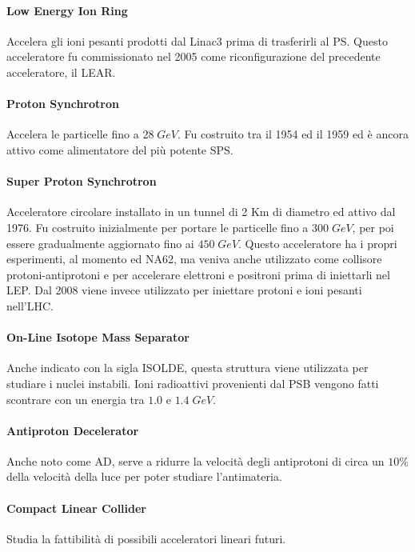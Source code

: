 		\paragraph{Low Energy Ion Ring}Accelera gli ioni pesanti prodotti dal Linac3 prima di trasferirli al \ac{PS}. Questo acceleratore fu commissionato nel 2005 come riconfigurazione del precedente acceleratore, il \ac{LEAR}.
		
		\paragraph{Proton Synchrotron}Accelera le particelle fino a $28 \; GeV$. Fu costruito tra il 1954 ed il 1959 ed è ancora attivo come alimentatore del più potente \ac{SPS}.
		
		\paragraph{Super Proton Synchrotron}Acceleratore circolare installato in un tunnel di 2 Km di diametro ed attivo dal 1976. Fu costruito inizialmente per portare le particelle fino a $300 \; GeV$, per poi essere gradualmente aggiornato fino ai $450 \; GeV$. Questo acceleratore ha i propri esperimenti, al momento  ed NA62, ma veniva anche utilizzato come collisore protoni-antiprotoni e per accelerare elettroni e positroni prima di iniettarli nel \ac{LEP}. Dal 2008 viene invece utilizzato per iniettare protoni e ioni pesanti nell'\ac{LHC}.
		
		\paragraph{On-Line Isotope Mass Separator}Anche indicato con la sigla \acs{ISOLDE}, questa struttura viene utilizzata per studiare i nuclei instabili. Ioni radioattivi provenienti dal \ac{PSB} vengono fatti scontrare con un energia tra $1.0$ e $1.4 \; GeV$.
		
		\paragraph{Antiproton Decelerator}Anche noto come \acs{AD}, serve a ridurre la velocità degli antiprotoni di circa un $10\%$ della velocità della luce per poter studiare l'antimateria.
		
		\paragraph{Compact Linear Collider}Studia la fattibilità di possibili acceleratori lineari futuri.
		
